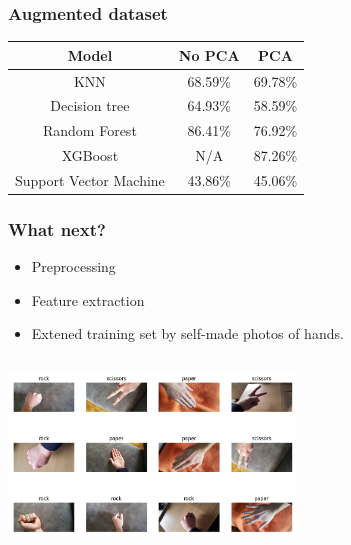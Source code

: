 \documentclass{beamer}
\begin{document}
\begin{frame}
  \frametitle{Augmented dataset}

  \begin{table}
    \centering
    \begin{tabular}{|c|c|c|}
      \hline
      \textbf{Model} & \textbf{No PCA} & \textbf{PCA} \\
      \hline
      KNN & 68.59\% & 69.78\% \\
      \hline
      Decision tree & 64.93\% & 58.59\% \\
      \hline
      Random Forest & 86.41\% & 76.92\% \\
      \hline
      XGBoost & N/A & 87.26\% \\
      \hline
      Support Vector Machine & 43.86\% & 45.06\% \\
      \hline
    \end{tabular}
  \end{table}

\end{frame}

\begin{frame}
  \frametitle{What next?}

    \begin{itemize}
        \item Preprocessing

        \item Feature extraction

        \item Extened training set by self-made photos of hands.

    \end{itemize}

    \centering
\includegraphics[height=2in, width=3in]{images/real.png}

\end{frame}
\end{document}
